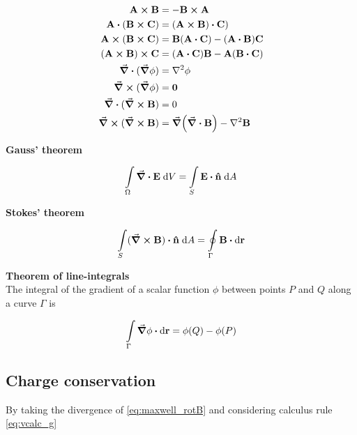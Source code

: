 \begin{subequations}
\label{eq:vcalc}
\begin{align}
\vb{A} \cross \vb{B} &= - \vb{B} \cross \vb{A} \label{eq:vcalc_a}\\
\vb{A} \vdot (\vb{B} \cross \vb{C}) &= (\vb{A} \cross \vb{B}) \vdot \vb{C}) \label{eq:vcalc_b}\\
\vb{A} \cross (\vb{B} \cross \vb{C}) &= \vb{B} (\vb{A} \vdot \vb{C}) - (\vb{A} \vdot \vb{B})\vb{C} \label{eq:vcalc_c}\\
(\vb{A} \cross \vb{B}) \cross \vb{C} &= (\vb{A} \vdot \vb{C}) \vb{B} - \vb{A} (\vb{B} \vdot \vb{C}) \label{eq:vcalc_d}\\
\div{(\grad{\phi})} &= \laplacian{\phi} \label{eq:vcalc_e}\\
\curl{(\grad{\phi})} &= \vb{0} \label{eq:vcalc_f}\\
\div{(\curl{\vb{B}})} &= 0 \label{eq:vcalc_g}\\
\curl{(\curl{\vb{B}})} &= \grad(\div{\vb{B}}) - \laplacian{\vb{B}}  \label{eq:vcalc_h}
\end{align}
\end{subequations}

\textbf{Gauss' theorem}

\begin{equation}
\int\limits_{\Omega}\div{\vb{E}} \; \mathrm{d}V = \int\limits_{S}\vb{E} \vdot \vu{n} \; \mathrm{d}A \label{eq:Gauss}
\end{equation}

\textbf{Stokes' theorem}

\begin{equation}
\int\limits_{S}(\curl{\vb{B}}) \vdot \vu{n} \; \mathrm{d}A = \oint\limits_{\Gamma} \vb{B} \vdot \mathrm{d}\vb{r}  \label{eq:Stokes}
\end{equation}

\textbf{Theorem of line-integrals}\\
The integral of the gradient of a scalar function $\phi$ between points $P$ and $Q$ along a curve $\Gamma$ is
  
\begin{equation*}
\int\limits_{\Gamma} \grad{\phi} \vdot \mathrm{d}\vb{r} = \phi(Q) - \phi(P)  \label{eq:LineInt}
\end{equation*}


\subsection*{Charge conservation}
By taking the divergence of \ref{eq:maxwell_rotB} and considering calculus rule \ref{eq:vcalc_g}


